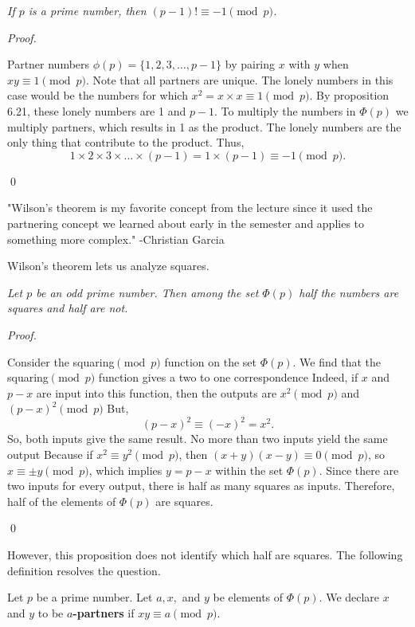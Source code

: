 \documentclass[12pt]{article}
\newenvironment{theorem}[2][Theorem]{\begin{trivlist}
\item[\hskip \labelsep {\bfseries #1}\hskip \labelsep {\bfseries #2}]}{\end{trivlist}}
\newenvironment{proposition}[2][Proposition]{\begin{trivlist}
\item[\hskip \labelsep {\bfseries #1}\hskip \labelsep {\bfseries #2}]}{\end{trivlist}}
\newenvironment{definition}[2][Definition]{\begin{trivlist}
\item[\hskip \labelsep {\bfseries #1}\hskip \labelsep {\bfseries #2}]}{\end{trivlist}}
\newenvironment{sol}
    {\emph{Proof.}
    }
    {
    \qed
    }
\begin{document}
\begin{theorem}{8.2 (Wilson's Theorem)}
\textit{If $p$ is a prime number, then $(p-1)! \equiv -1 \pmod{p}$.}
\end{theorem}
\begin{sol}
  Partner numbers $\phi(p) = \{1,2,3,\dots,p-1\}$ by pairing $x$ with $y$ when $xy \equiv 1 \pmod{p}$. 
  Note that all partners are unique. The lonely numbers in this case would be the numbers for which $x^2 = x \times x \equiv 1 \pmod{p}$. 
  By proposition 6.21, these lonely numbers are 1 and $p - 1$. To multiply the numbers in $\Phi(p)$ we multiply partners, which results in 1 as the product. 
  The lonely numbers are the only thing that contribute to the product. Thus, $$1 \times 2 \times 3 \times ... \times (p-1) = 1 \times (p-1) \equiv -1 \pmod{p}.$$
\end{sol}

"Wilson's theorem is my favorite concept from the lecture since it used the partnering concept we learned about early in the semester and applies to something more complex." -Christian Garcia

\vspace{1em}

Wilson's theorem lets us analyze squares.

\begin{proposition}{8.3} \textit{Let $p$ be an odd prime number. Then among the set $\Phi(p)$ half the numbers are squares and half are not.}
\end{proposition}
\begin{sol}
Consider the squaring$\pmod{p}$ function on the set $\Phi(p)$. We find that the squaring$\pmod{p}$ function gives a two to one correspondence Indeed, if $x$ and $p - x$ are input into this function, then the outputs are $x^2 \pmod{p}$ and $(p - x)^2 \pmod{p}$ But, $$(p - x)^2 \equiv (-x)^2 = x^2.$$ So, both inputs give the same result. No more than two inputs yield the same output Because if $x^2 \equiv y^2 \pmod{p}$, then $(x + y)( x - y) \equiv 0 \pmod{p}$, so $x \equiv \pm y \pmod{p}$, which implies $y = p - x$ within the set $\Phi(p)$. Since there are two inputs for every output, there is half as many squares as inputs. Therefore, half of the elements of $\Phi(p)$ are squares. 
\end{sol}

However, this proposition does not identify which half are squares. The following definition resolves the question.

\begin{definition}{8.4}
  Let $p$ be a prime number. Let $a,x,$ and $y$ be elements of $\Phi(p)$. We declare $x$ and $y$ to be $a$\textbf{-partners} if $xy \equiv a \pmod{p}$.
\end{definition}
\end{document}

